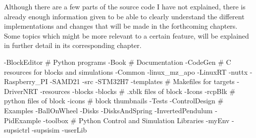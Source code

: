 \quad Although there are a few parts of the source code I have not explained, there is already enough information given to be able
to clearly understand the different implementations and changes that will be made in the  forthcoming chapters. Some topics which
might be more relevant to a certain feature, will be explained in further detail in its corresponding chapter.

\begtt
-BlockEditor		# Python programs
-Book			# Documentation
-CodeGen		# C resources for blocks and simulations
	-Common
	-linux_mz_apo
	-LinuxRT
	-nuttx
	-Raspberry_PI
	-SAMD21
	-src
	-STM32H7
	-templates	# Makefiles for targets
-DriverNRT
-resources
	-blocks
		-blocks		# .xblk files of block
		-Icons
		-rcpBlk		# python files of block
	-icons		# block thumbnails
-Tests
	-ControlDesign		# Examples
		-BallOnWheel
		-Disks
		-DisksAndSpring
		-InvertedPendulum
		-PidExample
-toolbox			# Python Control and Simulation Libraries
	-myEnv
	-supsictrl
	-supsisim
-userLib
\endtt